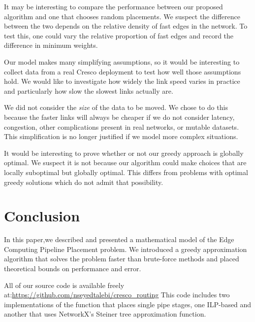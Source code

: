 \documentclass{acmart}
\begin{document}
 	 It may be interesting to compare the performance between our proposed algorithm and one that chooses random placements. We suspect the difference between the two depends on the relative density of fast edges in the network. To test this, one could vary the relative proportion of fast edges and record the difference in minimum weights.
 	 
 	 Our model makes many simplifying assumptions, so it would be interesting to collect data from a real Cresco deployment to test how well those assumptions hold. We would like to investigate how widely the link speed varies in practice and particularly how slow the slowest links actually are.
 	 
 	 We did not consider the \textit{size} of the data to be moved. We chose to do this because the faster links will always be cheaper if we do not consider latency, congestion, other complications present in real networks, or mutable datasets. This simplification is no longer justified if we model more complex situations.
 	 
 	 It would be interesting to prove whether or not our greedy approach is globally optimal. We suspect it is not because our algorithm could make choices that are locally suboptimal but globally optimal. This differs from problems with optimal greedy solutions which do not admit that possibility.
 	  
 	 \section{Conclusion}
 	 In this paper,we described and presented a mathematical model of the Edge Computing Pipeline Placement problem. We introduced a greedy approximation algorithm that solves the problem faster than brute-force methods and placed theoretical bounds on performance and error.

	All of our source code is available freely at:\url{https://github.com/nseyedtalebi/cresco_routing} This code includes two implementations of the function that places single pipe stages, one ILP-based and another that uses NetworkX's Steiner tree approximation function.	
	
	
	
\end{document}
